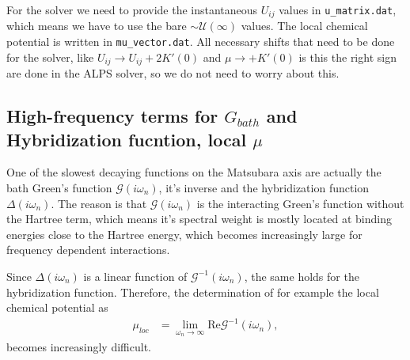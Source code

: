 \documentclass[12pt,a4paper]{scrartcl}
\numberwithin{equation}{section}
\newcommand{\cng}[1]{{\color{red}#1}}
\begin{document}
For the solver we need to provide the instantaneous $U_{ij}$ values in 
\verb|u_matrix.dat|,  which means we have to use the bare 
$\sim\mathcal{U}(\infty)$ values. The local chemical potential is written
in \verb|mu_vector.dat|. All necessary shifts that need to be done for the solver, like
$U_{ij} \rightarrow U_{ij} + 2K'(0)$ and $\mu\rightarrow + K'(0)$ 
\cng{is this the right sign} are done in the ALPS solver, so we do not
need to worry about this.



\subsection{High-frequency terms for $G_{bath}$ and Hybridization fucntion, local $\mu$}
One of the slowest decaying functions on the Matsubara axis
are actually the bath Green's function $\mathscr{G}(i\omega_n)$, it's inverse
and the hybridization function $\Delta(i\omega_n)$.
The reason is that $\mathscr{G}(i\omega_n)$ is the interacting
Green's function without the Hartree term, which means it's spectral weight
is mostly located at binding energies close to the Hartree energy, which
becomes increasingly large for frequency dependent interactions.

Since $\Delta(i\omega_n)$ is a linear function of $\mathscr{G}^{-1}(i\omega_n)$,
the same holds for the hybridization function.
Therefore,
the determination of for example the local chemical potential as
\begin{align}
 \mu_{loc} 
 &= \lim_{\omega_n\rightarrow \infty} \mathrm{Re}\mathscr{G}^{-1}(i\omega_n),
\end{align}
becomes increasingly difficult.
\end{document}
